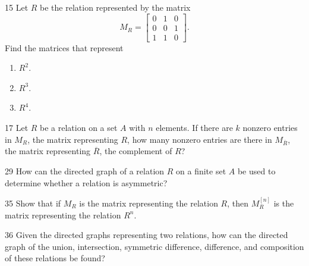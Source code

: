\documentclass[11pt]{article}
\begin{document}
\begin{exercise}{15}
    Let $R$ be the relation represented by the matrix
    \[
    M_R = \begin{bmatrix} 0 & 1 & 0 \\ 0 & 0 & 1 \\ 1 & 1 & 0 \end{bmatrix}.
    \]
    Find the matrices that represent
    \begin{enumerate}[label=(\alph*)]
        \item $R^2$.
        \item $R^3$.
        \item $R^4$.
    \end{enumerate}
\end{exercise}

\begin{exercise}{17}
    Let $R$ be a relation on a set $A$ with $n$ elements. If there are
    $k$ nonzero entries in $M_R$, the matrix representing $R$, how
    many nonzero entries are there in $M_{\overline{R}}$, the matrix
    representing $\overline{R}$, the complement of $R$?
\end{exercise}

\begin{exercise}{29}
    How can the directed graph of a relation $R$ on a finite set $A$
    be used to determine whether a relation is asymmetric?
\end{exercise}

\begin{exercise}{35}
    Show that if $M_R$ is the matrix representing the relation $R$,
    then $M_R^{[n]}$ is the matrix representing the relation $R^n$.
\end{exercise}

\begin{exercise}{36}
    Given the directed graphs representing two relations, how can the
    directed graph of the union, intersection, symmetric difference,
    difference, and composition of these relations be found?
\end{exercise}
\end{document}
